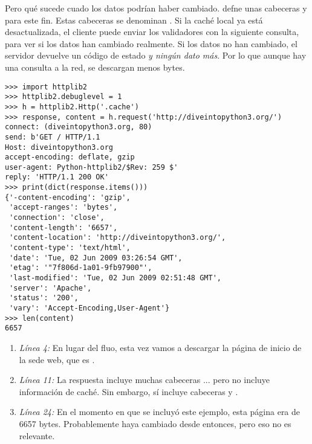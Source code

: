 Pero qué sucede cuado los datos podrían haber cambiado.  defne unas cabeceras  y  para este fin. Estas cabeceras se denominan . Si la caché local ya está desactualizada, el cliente puede enviar los validadores con la siguiente consulta, para ver si los datos han cambiado realmente. Si los datos no han cambiado, el servidor devuelve un código de estado  \emph{y ningún dato más}. Por lo que aunque hay una consulta a la red, se descargan menos bytes.

\noindent\begin{minipage}{\textwidth}
\begin{lstlisting}[mathescape=False]
>>> import httplib2
>>> httplib2.debuglevel = 1
>>> h = httplib2.Http('.cache')
>>> response, content = h.request('http://diveintopython3.org/')
connect: (diveintopython3.org, 80)
send: b'GET / HTTP/1.1
Host: diveintopython3.org
accept-encoding: deflate, gzip
user-agent: Python-httplib2/$Rev: 259 $'
reply: 'HTTP/1.1 200 OK'
>>> print(dict(response.items())) 
{'-content-encoding': 'gzip',
 'accept-ranges': 'bytes',
 'connection': 'close',
 'content-length': '6657',
 'content-location': 'http://diveintopython3.org/',
 'content-type': 'text/html',
 'date': 'Tue, 02 Jun 2009 03:26:54 GMT',
 'etag': '"7f806d-1a01-9fb97900"',
 'last-modified': 'Tue, 02 Jun 2009 02:51:48 GMT',
 'server': 'Apache',
 'status': '200',
 'vary': 'Accept-Encoding,User-Agent'}
>>> len(content)                
6657
\end{lstlisting}
\end{minipage}

\begin{enumerate}

\item \emph{Línea 4:} En lugar del fluo, esta vez vamos a descargar la página de inicio de la sede web, que es .

\item \emph{Línea 11:} La respuesta incluye muchas cabeceras ... pero no incluye información de caché. Sin embargo, sí incluye cabeceras  y .

\item \emph{Línea 24:} En el momento en que se incluyó este ejemplo, esta página era de 6657 bytes. Probablemente haya cambiado desde entonces, pero eso no es relevante. 

\end{enumerate}


